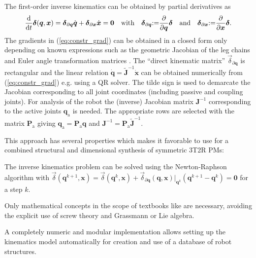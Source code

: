 \documentclass[
	graybox,
	vecphys] %
	{svmult}
\newcommand{\bm}[1]{\boldsymbol{#1}}
\newcommand{\Res}[0]{\vec{\delta}}
\begin{document}
%
The first-order inverse kinematics can be obtained by partial derivatives as
%
\vspace{-0.2cm} %
\begin{equation}
\frac{\mathrm{d}}{{\mathrm{d}}t} \Res(\bm{q},\bm{x})
=
\Res_{\partial \bm{q}} \dot{\bm{q}}
+
\Res_{\partial \bm{x}} \dot{\bm{x}}
=
\bm{0}
\quad \mathrm{with} \quad
\Res_{\partial \bm{q}}{:=}\frac{\partial}{\partial \bm{q}} \Res \quad \mathrm{and} \quad \Res_{\partial \bm{x}}{:=}\frac{\partial}{\partial \bm{x}} \Res.
\label{eq:constr_grad}
\vspace{-0.1cm} %
\end{equation}
%
The gradients in (\ref{eq:constr_grad}) can be obtained in a closed form only depending on known expressions such as the geometric Jacobian of the leg chains and Euler angle transformation matrices \cite{SchapplerTapOrt2019}.
The ``direct kinematic matrix'' \cite{Gogu2008} $\Res_{\partial \bm{q}}$ is rectangular and the linear relation $\dot{\bm{q}}=\tilde{\bm{J}}^{-1} \dot{\bm{x}}$ can be obtained numerically from (\ref{eq:constr_grad}) e.g. using a QR solver.
The tilde sign is used to demarcate the Jacobian corresponding to all joint coordinates (including passive and coupling joints).
For analysis of the robot the (inverse) Jacobian matrix $\bm{J}^{-1}$ corresponding to the active joints $\bm{q}_{\mathrm{a}}$ is needed.
The appropriate rows are selected with the matrix $\bm{P}_{\mathrm{a}}$ giving $\bm{q}_{\mathrm{a}} = \bm{P}_{\mathrm{a}} \bm{q}$ and $\bm{J}^{-1}=\bm{P}_{\mathrm{a}} \tilde{\bm{J}}^{-1}$.

This approach has several properties which makes it favorable to use for a combined structural and dimensional synthesis of symmetric 3T2R PMs:

\begin{compactitem}
\item The inverse kinematics problem can be solved using the Newton-Raphson algorithm with $\Res(\bm{q}^{k+1},\bm{x}) {=}
\Res(\bm{q}^{k},\bm{x})
+
\Res_{\partial \bm{q}}(\bm{q},\bm{x}) \rvert_{\bm{q}^k} (\bm{q}^{k+1} {-} \bm{q}^k){=}\bm{0}$ for a step $k$.
\item Only mathematical concepts in the scope of textbooks like \cite{Merlet2006} are necessary, avoiding the explicit use of screw theory and Grassmann or Lie algebra.
\item A completely numeric and modular implementation allows setting up the kinematics model automatically for creation and use of a database of robot structures.
\end{compactitem}
\end{document}
